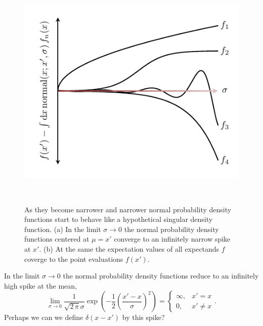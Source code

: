 \documentclass[
  letterpaper,
  DIV=11,
  numbers=noendperiod]{scrartcl}
\begin{document}
\begin{figure}
\begin{minipage}[t]{0.45\linewidth}
{{\includegraphics{figures/singular_density/converging_expectations/converging_expectations.pdf}

}

}

\subcaption{\label{fig-converging-expectations}}
\end{minipage}%
%
\begin{minipage}[t]{0.05\linewidth}

{\centering 

~

}

\end{minipage}%

\caption{\label{fig-singular-density}As they become narrower and
narrower normal probability density functions start to behave like a
hypothetical singular density function. (a) In the limit
\(\sigma \rightarrow 0\) the normal probability density functions
centered at \(\mu = x'\) converge to an infinitely narrow spike at
\(x'\). (b) At the same the expectation values of all expectands \(f\)
coverge to the point evaluations \(f(x')\).}

\end{figure}

In the limit \(\sigma \rightarrow 0\) the normal probability density
functions reduce to an infinitely high spike at the mean, \[
\lim_{\sigma \rightarrow 0}
\frac{1}{\sqrt{2 \, \pi} \sigma}
\exp \left( -\frac{1}{2} \left( \frac{x' - x}{\sigma} \right)^{2} \right)
=
\left\{
\begin{array}{rr}
\infty, & x' = x \\
0, & x' \ne x
\end{array}
\right. .
\] Perhaps we can we define \(\delta(x - x')\) by this spike?
\end{document}
